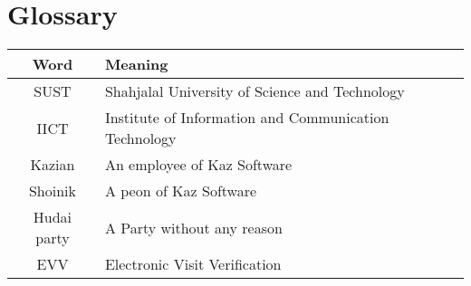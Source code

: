 \chapter{Glossary}

\setlength{\tabcolsep}{15pt}

\begin{tabular}{|c|l|}
\hline
\textbf{Word} & \textbf{Meaning} \\\hline
SUST & Shahjalal University of Science and Technology \\\hline
IICT & Institute of Information and Communication Technology \\\hline
Kazian & An employee of Kaz Software \\\hline
Shoinik & A peon of Kaz Software \\\hline
Hudai party & A Party without any reason \\\hline
EVV & Electronic Visit Verification \\\hline
\end{tabular}